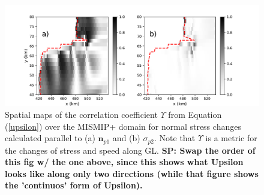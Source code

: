 \documentclass[tc, manuscript]{copernicus}
\begin{document}
\begin{figure}
	\centering
    \includegraphics[width=1\linewidth]{figs/stressDiff_velDiff_GL_allPerturb.pdf}
    \caption{Spatial maps of the correlation coefficient $\Upsilon$ from Equation (\ref{upsilon}) over the MISMIP+ domain for normal stress changes calculated parallel to (a) $\mathbf{n}_{p1}$  and (b) $\sigma_{p2}$. Note that $\Upsilon$ is a metric for the changes of stress and speed along GL. \textbf{SP: Swap the order of this fig w/ the one above, since this shows what Upsilon looks like along only two directions (while that figure shows the 'continuos' form of Upsilon).}}
	\label{stressDiff_velDiff_GL_allPerturb}
\end{figure}
\end{document}
